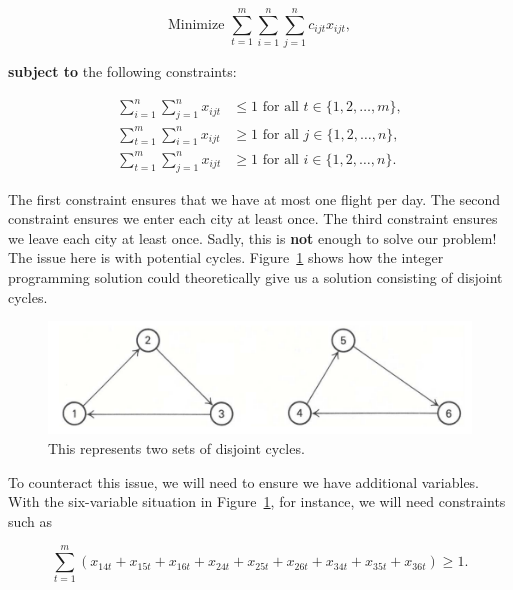 \documentclass{article}
\begin{document}
\begin{equation}
\mbox{Minimize } \sum_{t=1}^{m} \sum_{i=1}^{n} \sum_{j=1}^{n} c_{ijt}x_{ijt},
\end{equation}

\textbf{subject to} the following constraints:

\begin{align}
\sum_{i=1}^{n} \sum_{j=1}^{n} x_{ijt} &\le 1 \mbox{ for all } t \in \{1, 2, \ldots, m\}, \\ 
\sum_{t=1}^{m} \sum_{i=1}^{n} x_{ijt} &\ge 1 \mbox{ for all } j \in \{1, 2, \ldots, n\}, \\
\sum_{t=1}^{m} \sum_{j=1}^{n} x_{ijt} &\ge 1 \mbox{ for all } i \in \{1, 2, \ldots, n\}.
\end{align}

The first constraint ensures that we have at most one flight per day. The second constraint ensures we enter each city at least once. The third
constraint ensures we leave each city at least once. Sadly, this is \textbf{not} enough to solve our problem! The issue here is with potential cycles.
Figure~\ref{fig:bad_solution} shows how the integer programming solution could theoretically give us a solution consisting of disjoint cycles.

\begin{figure}[t]
\vskip 0.2in
\begin{center}
\centerline{\includegraphics[width=\columnwidth]{bad_solution}}
\caption{This represents two sets of disjoint cycles.}
\label{fig:bad_solution}
\end{center}
\vskip -0.2in
\end{figure}

To counteract this issue, we will need to ensure we have additional variables. With the six-variable situation in Figure~\ref{fig:bad_solution}, for
instance, we will need constraints such as

\begin{equation}
\sum_{t=1}^{m} (x_{14t} + x_{15t} + x_{16t} + x_{24t} + x_{25t} + x_{26t} + x_{34t} + x_{35t} + x_{36t}) \ge 1.
\end{equation}
\end{document}
